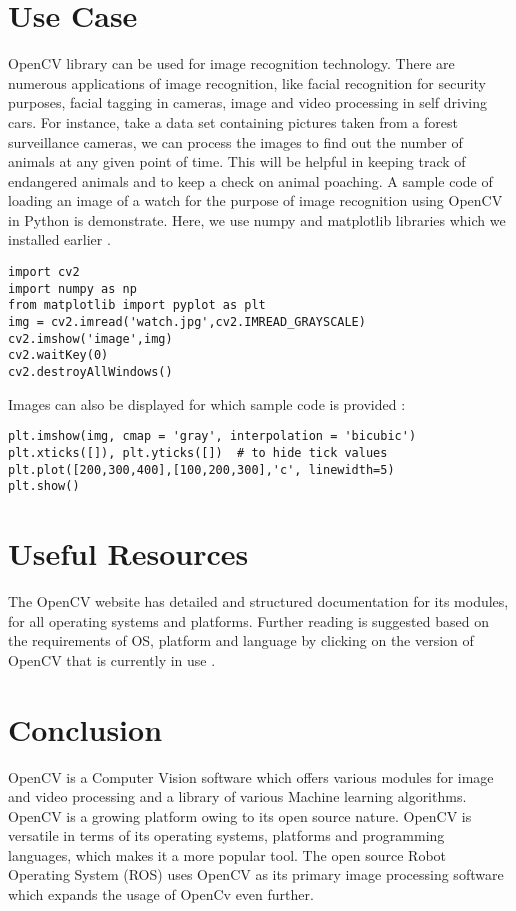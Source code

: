 \documentclass[9pt,twocolumn,twoside]{../../styles/osajnl}
\begin{document}
\section{Use Case}
OpenCV library can be used for image recognition technology. There are numerous applications of image recognition, like facial recognition for security purposes, facial tagging in cameras, image and video processing in self driving cars. For instance, take a data set containing pictures taken from a forest surveillance cameras, we can process the images to find out the number of animals at any given point of time. This will be helpful in keeping track of endangered animals and to keep a check on animal poaching. 
\newline A sample code of loading an image of a watch for the purpose of image recognition using OpenCV in Python is demonstrate.
\newline Here, we use numpy and matplotlib libraries which we installed earlier \cite{www-opencv-pythonprgm-tut}.
\begin{Verbatim}
import cv2
import numpy as np
from matplotlib import pyplot as plt
img = cv2.imread('watch.jpg',cv2.IMREAD_GRAYSCALE)
cv2.imshow('image',img)
cv2.waitKey(0)
cv2.destroyAllWindows()
\end{Verbatim}
Images can also be displayed for which sample code is provided \cite{www-opencv-pythonprgm-tut}:
\begin{Verbatim}
plt.imshow(img, cmap = 'gray', interpolation = 'bicubic')
plt.xticks([]), plt.yticks([])  # to hide tick values 
plt.plot([200,300,400],[100,200,300],'c', linewidth=5)
plt.show()
\end{Verbatim}
\section{Useful Resources}
The OpenCV website has detailed and structured documentation for its modules, for all operating systems and platforms. Further reading is suggested based on the requirements of OS, platform and language by clicking on the version of OpenCV that is currently in use \cite{www-opencv-docs}. 

\section{Conclusion}
OpenCV is a Computer Vision software which offers various modules for image and video processing and a library of various Machine learning algorithms. OpenCV is a growing platform owing to its open source nature. OpenCV is versatile in terms of its operating systems, platforms and programming languages, which makes it a more popular tool. The open source Robot Operating System (ROS) uses OpenCV as its primary image processing software which expands the usage of OpenCv even further. 
\end{document}
